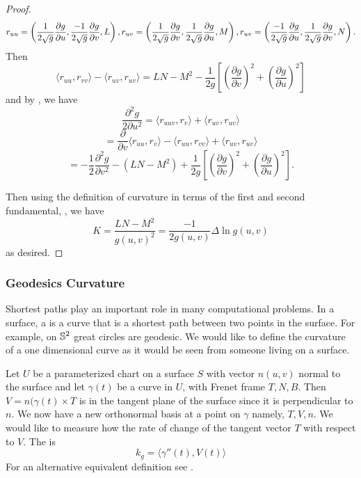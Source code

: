 \begin{proof}
	\begin{equation}\label{eqn:log-curve-proof-seconds}
		r_{uu}=\left(\frac{1}{2\sqrt{g}}\frac{\partial g}{\partial u},\frac{-1}{2\sqrt{g}}\frac{\partial g}{\partial v},L\right),\\
		r_{uv}=\left(\frac{1}{2\sqrt{g}}\frac{\partial g}{\partial v},\frac{1}{2\sqrt{g}}\frac{\partial g}{\partial u},M\right),\\
		r_{uv}=\left(\frac{-1}{2\sqrt{g}}\frac{\partial g}{\partial u},\frac{1}{2\sqrt{g}}\frac{\partial g}{\partial v},N\right).
	\end{equation}
	Then
	$$\langle r_{uu},r_{vv}\rangle -\langle r_{uv},r_{uv}\rangle=LN-M^2-\frac{1}{2g}\left[\left(\frac{\partial g}{\partial v}\right)^2+
	\left(\frac{\partial g}{\partial u}\right)^2\right]$$
	and by , we have
	$$\frac{\partial^2 g}{2\partial u^2}=\langle r_{uuv},r_{v}\rangle+\langle r_{uv},r_{uv}\rangle$$
	$$=\frac{\partial}{\partial v}\langle r_{uu},r_{v}\rangle - \langle r_{uu},r_{vv}\rangle+\langle r_{uv},r_{uv}\rangle$$
	$$=-\frac{1}{2}\frac{\partial^2 g}{\partial v^2}-(LN-M^2)+\frac{1}{2g}\left[\left(\frac{\partial g}{\partial v}\right)^2+
	\left(\frac{\partial g}{\partial u}\right)^2\right].$$
	
	Then using the definition of curvature in terms of the first and second fundamental, ,
	we have
	$$K=\frac{LN-M^2}{g(u,v)^2}=\frac{-1}{2g(u,v)}\Delta \ln g(u,v)$$
	as desired.
\end{proof}

\subsubsection{Geodesics Curvature}

Shortest paths play an important role in many computational problems.
In a surface, a  is a curve that is a shortest path
between two points in the surface. 
For example, on $\mathbb{S}^2$ great circles are geodesic.
We would like to define the curvature of a one dimensional curve as it would
 be seen from someone living on a surface.

Let $U$ be a parameterized chart on a surface $S$ with vector $n(u,v)$ normal
to the surface
and let $\gamma(t)$ be a curve in $U$, with Frenet frame $T,N,B$.
Then $V=n(\gamma(t)\times T$ is in the tangent plane of the surface since
it is perpendicular to $n$. We now have a new orthonormal basis at a point on $\gamma$
namely, $T,V,n$. 
We would like to measure how the rate of change of the tangent vector $T$ with respect to $V$.
The  is  
\begin{equation} \label{eqn:geodesic}
	k_g=\langle \gamma''(t),V(t)\rangle
\end{equation}
For an alternative equivalent definition see \cite{doc76}.



